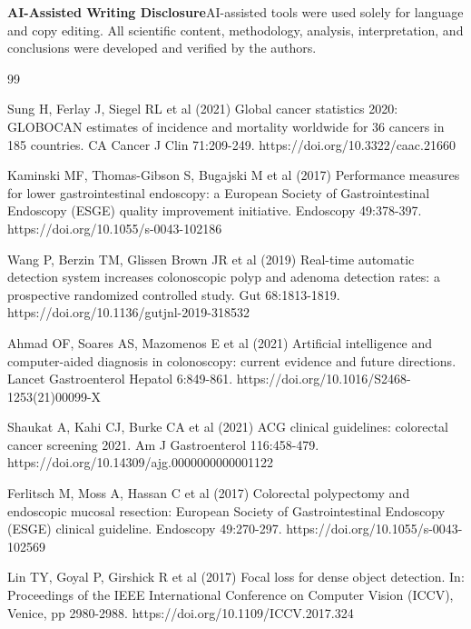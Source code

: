 \documentclass[11pt,a4paper]{article}
\begin{document}
\noindent\textbf{AI-Assisted Writing Disclosure}\quad AI-assisted tools
were used solely for language and copy editing. All scientific content,
methodology, analysis, interpretation, and conclusions were developed and
verified by the authors.


\begin{thebibliography}{99}

Sung H, Ferlay J, Siegel RL et al (2021) Global cancer statistics 2020:
  {GLOBOCAN} estimates of incidence and mortality worldwide for 36 cancers
  in 185 countries. CA Cancer J Clin 71:209-249.
  https://doi.org/10.3322/caac.21660

Kaminski MF, Thomas-Gibson S, Bugajski M et al (2017) Performance measures
  for lower gastrointestinal endoscopy: a {European Society of
  Gastrointestinal Endoscopy (ESGE)} quality improvement initiative.
  Endoscopy 49:378-397. https://doi.org/10.1055/s-0043-102186

Wang P, Berzin TM, Glissen Brown JR et al (2019) Real-time automatic
  detection system increases colonoscopic polyp and adenoma detection
  rates: a prospective randomized controlled study. Gut 68:1813-1819.
  https://doi.org/10.1136/gutjnl-2019-318532

Ahmad OF, Soares AS, Mazomenos E et al (2021) Artificial intelligence and
  computer-aided diagnosis in colonoscopy: current evidence and future
  directions. Lancet Gastroenterol Hepatol 6:849-861.
  https://doi.org/10.1016/S2468-1253(21)00099-X

Shaukat A, Kahi CJ, Burke CA et al (2021) {ACG} clinical guidelines:
  colorectal cancer screening 2021. Am J Gastroenterol 116:458-479.
  https://doi.org/10.14309/ajg.0000000000001122

Ferlitsch M, Moss A, Hassan C et al (2017) Colorectal polypectomy and
  endoscopic mucosal resection: {European Society of Gastrointestinal
  Endoscopy (ESGE)} clinical guideline. Endoscopy 49:270-297.
  https://doi.org/10.1055/s-0043-102569

Lin TY, Goyal P, Girshick R et al (2017) Focal loss for dense object
  detection. In: Proceedings of the IEEE International Conference on
  Computer Vision (ICCV), Venice, pp 2980-2988.
  https://doi.org/10.1109/ICCV.2017.324


\end{thebibliography}
\end{document}
